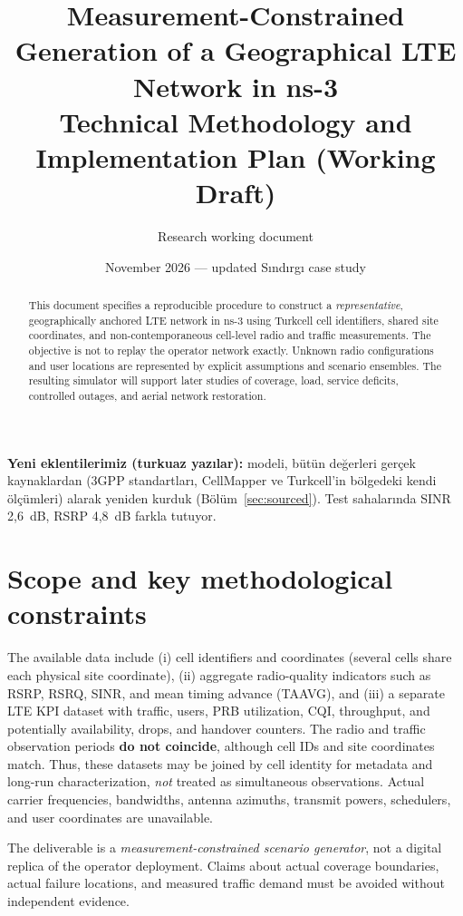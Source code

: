 \documentclass[11pt,a4paper]{article}
\title{Measurement-Constrained Generation of a Geographical LTE Network in ns-3\\\large Technical Methodology and Implementation Plan (Working Draft)}
\author{Research working document}
\date{November 2026 --- updated S\i nd\i rg\i{} case study}
\newenvironment{yeni}{\par\smallskip\color{teal}}{\par\smallskip}
\begin{document}
\maketitle
\begin{abstract}
This document specifies a reproducible procedure to construct a \emph{representative}, geographically anchored LTE network in ns-3 using Turkcell cell identifiers, shared site coordinates, and non-contemporaneous cell-level radio and traffic measurements. The objective is not to replay the operator network exactly. Unknown radio configurations and user locations are represented by explicit assumptions and scenario ensembles. The resulting simulator will support later studies of coverage, load, service deficits, controlled outages, and aerial network restoration.
\end{abstract}

\begin{yeni}
\textbf{Yeni eklentilerimiz (turkuaz yazılar):}  modeli, bütün değerleri gerçek kaynaklardan (3GPP standartları, CellMapper ve Turkcell'in bölgedeki kendi ölçümleri) alarak yeniden kurduk (Bölüm~\ref{sec:sourced}). Test sahalarında SINR 2,6~dB, RSRP 4,8~dB farkla tutuyor.
\end{yeni}

\section{Scope and key methodological constraints}
The available data include (i) cell identifiers and coordinates (several cells share each physical site coordinate), (ii) aggregate radio-quality indicators such as RSRP, RSRQ, SINR, and mean timing advance (TAAVG), and (iii) a separate LTE KPI dataset with traffic, users, PRB utilization, CQI, throughput, and potentially availability, drops, and handover counters. The radio and traffic observation periods \textbf{do not coincide}, although cell IDs and site coordinates match. Thus, these datasets may be joined by cell identity for metadata and long-run characterization, \emph{not} treated as simultaneous observations. Actual carrier frequencies, bandwidths, antenna azimuths, transmit powers, schedulers, and user coordinates are unavailable.

The deliverable is a \emph{measurement-constrained scenario generator}, not a digital replica of the operator deployment. Claims about actual coverage boundaries, actual failure locations, and measured traffic demand must be avoided without independent evidence.
\end{document}
